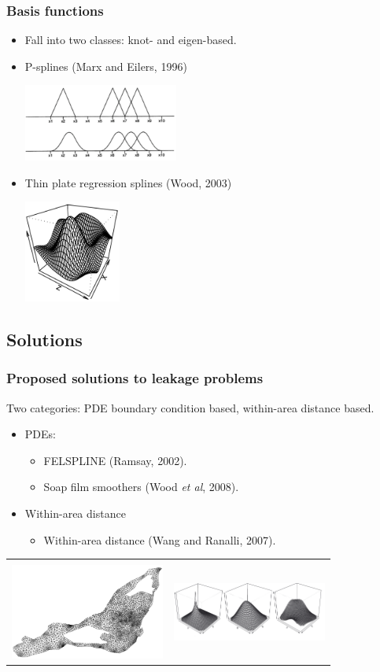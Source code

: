 \documentclass[ignorenonframetext]{beamer} %
\newcommand{\bc}{\begin{center}}
\newcommand{\ec}{\end{center}}
\newcommand{\bi}{\begin{itemize}}
\newcommand{\ei}{\end{itemize}}
\begin{document}
\begin{frame}
	\frametitle{Basis functions}
       \bi
       	  \item Fall into two classes: knot- and eigen-based.
         \item P-splines (Marx and Eilers, 1996)
          \bc
         \includegraphics[width=2in]{figs/bsplines} 
         \ec
         \item Thin plate regression splines (Wood, 2003)
         \bc
         \includegraphics[width=1.25in]{figs/tprs} 
         \ec
        \ei
\end{frame}

\subsection{Solutions}

\begin{frame}
	\frametitle{Proposed solutions to leakage problems}
	Two categories: PDE boundary condition based, within-area distance based.
       \bi
         \item PDEs:
	  \bi
             \item FELSPLINE (Ramsay, 2002).
             \item Soap film smoothers (Wood \emph{et al}, 2008).
           \ei
           \item Within-area distance
           \bi
             \item Within-area distance (Wang and Ranalli, 2007).
           \ei
        \ei
        \bc\begin{tabular}{@{}cc}
          & \\
        \includegraphics[width=2in]{figs/ramsaytriangulation.png}&\includegraphics[width=2in]{figs/soapbases.png}\\
        \end{tabular}
        \ec
\end{frame}
\end{document}
